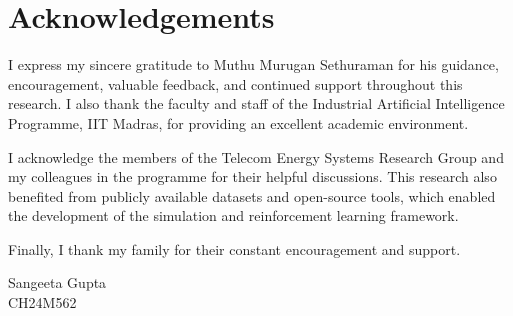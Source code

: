\chapter{Acknowledgements}

I express my sincere gratitude to Muthu Murugan Sethuraman for his guidance, encouragement, valuable feedback, and continued support throughout this research. I also thank the faculty and staff of the Industrial Artificial Intelligence Programme, IIT Madras, for providing an excellent academic environment.

I acknowledge the members of the Telecom Energy Systems Research Group and my colleagues in the programme for their helpful discussions. This research also benefited from publicly available datasets and open-source tools, which enabled the development of the simulation and reinforcement learning framework.

Finally, I thank my family for their constant encouragement and support.

\vspace{2\baselineskip}

\begin{flushright}
Sangeeta Gupta\\
CH24M562
\end{flushright}